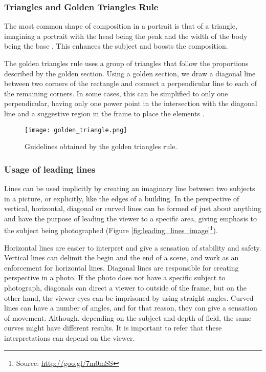 \subsubsection{Triangles and Golden Triangles Rule}
\label{subsub:rule_triangles}

The most common shape of composition in a portrait is that of a triangle, imagining a portrait with the head being the peak and the width of the body being the base \cite{cleghorn2004portrait}. This enhances the subject and boosts the composition.

The golden triangles rule uses a group of triangles that follow the proportions described by the golden section. Using a golden section, we draw a diagonal line between two corners of the rectangle and connect a perpendicular line to each of the remaining corners. In some cases, this can be simplified to only one perpendicular, having only one power point in the intersection with the diagonal line and a suggestive region in the frame to place the elements \cite{Santos}.

\begin{figure}[htbp]
    \centering
	\label{fig:golden_triangle_example}
    \texttt{[image: golden\_triangle.png]}
	\caption{Guidelines obtained by the golden triangles rule.}
	\label{fig:golden_triangle_image}
\end{figure}

\subsubsection{Usage of leading lines}
\label{subsub:leading_lines}

Lines can be used implicitly by creating an imaginary line between two subjects in a picture, or explicitly, like the edges of a building. In the perspective of \citeauthor{kamps2012rules} \cite{kamps2012rules} vertical, horizontal, diagonal or curved lines can be formed of just about anything and have the purpose of leading the viewer to a specific area, giving emphasis to the subject being photographed (Figure \ref{fig:leading_lines_image}\footnote{Source: \url{http://goo.gl/7m0mSS}}).

Horizontal lines are easier to interpret and give a sensation of stability and safety. Vertical lines can delimit the begin and the end of a scene, and work as an enforcement for horizontal lines.
Diagonal lines are responsible for creating perspective in a photo. If the photo does not have a specific subject to photograph, diagonals can direct a viewer to outside of the frame, but on the other hand, the viewer eyes can be imprisoned by using straight angles. 
Curved lines can have a number of angles, and for that reason, they can give a sensation of movement. Although, depending on the subject and depth of field, the same curves might have different results. It is important to refer that these interpretations can depend on the viewer.

